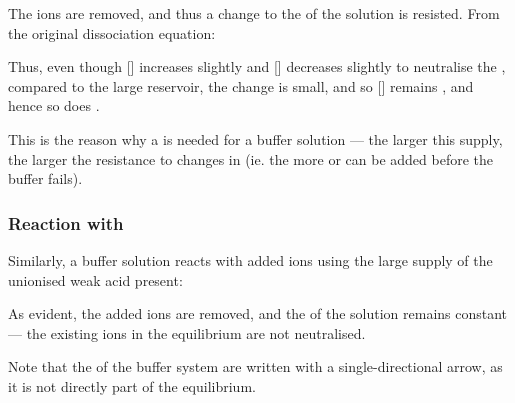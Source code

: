 
				The  ions are removed, and thus a change to the \pH{} of the solution is resisted. From the original dissociation
				equation:


				Thus, even though [] increases slightly and [] decreases slightly to neutralise the , compared
				to the large reservoir, the change is small, and so [] remains , and hence so does \pH{}.

				This is the reason why a  is needed for a buffer solution --- the larger this supply, the larger the
				resistance to changes in \pH{} (ie. the more  or  can be added before the buffer fails).




			\subsubsection{Reaction with \texorpdfstring{}{OH⁻}}

				Similarly, a buffer solution reacts with added  ions using the large supply of the unionised weak acid present:


				As evident, the added  ions are removed, and the \pH{} of the solution remains constant --- the existing  ions
				in the equilibrium are not neutralised.

				Note that the  of the buffer system are written with a single-directional arrow, as it is not
				directly part of the equilibrium.



